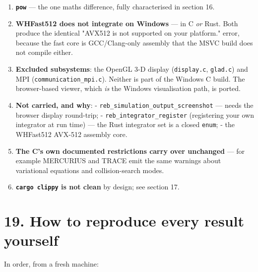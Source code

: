 \documentclass[11pt]{article}
\begin{document}
\begin{enumerate}
\item \textbf{\texttt{pow}} --- the one maths difference, fully characterised in section 16.
\item \textbf{WHFast512 does not integrate on Windows} --- in C \emph{or} Rust. Both produce the identical "AVX512 is not supported on your platform." error, because the fast core is GCC/Clang-only assembly that the MSVC build does not compile either.
\item \textbf{Excluded subsystems}: the OpenGL 3-D display (\texttt{display.c}, \texttt{glad.c}) and MPI (\texttt{communication\_mpi.c}). Neither is part of the Windows C build. The browser-based viewer, which \emph{is} the Windows visualisation path, is ported.
\item \textbf{Not carried, and why}: - \texttt{reb\_simulation\_output\_screenshot} --- needs the browser display round-trip; - \texttt{reb\_integrator\_register} (registering your own integrator at run time) --- the Rust integrator set is a closed \texttt{enum}; - the WHFast512 AVX-512 assembly core.
\item \textbf{The C's own documented restrictions carry over unchanged} --- for example MERCURIUS and TRACE emit the same warnings about variational equations and collision-search modes.
\item \textbf{\texttt{cargo clippy} is not clean} by design; see section 17.
\end{enumerate}

\section{19. How to reproduce every result yourself}

In order, from a fresh machine:
\end{document}
